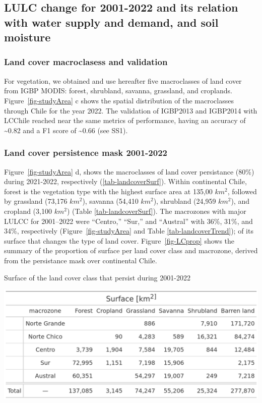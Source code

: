\documentclass[
  authoryear,
  preprint,
  3p,
  onecolumn]{elsarticle}
\begin{document}
\hypertarget{lulc-change-for-2001-2022-and-its-relation-with-water-supply-and-demand-and-soil-moisture}{%
\subsection{LULC change for 2001-2022 and its relation with water supply
and demand, and soil
moisture}\label{lulc-change-for-2001-2022-and-its-relation-with-water-supply-and-demand-and-soil-moisture}}

\hypertarget{land-cover-macroclasess-and-validation-1}{%
\subsubsection{Land cover macroclasess and
validation}\label{land-cover-macroclasess-and-validation-1}}

For vegetation, we obtained and use hereafter five macroclasses of land
cover from IGBP MODIS: forest, shrubland, savanna, grassland, and
croplands. Figure~\ref{fig-studyArea} c shows the spatial distribution
of the macroclasses through Chile for the year 2022. The validation of
IGBP2013 and IGBP2014 with LCChile reached near the same metrics of
performance, having an accuracy of \textasciitilde0.82 and a F1 score of
\textasciitilde0.66 (see SS1).

\hypertarget{sec-persistence_mask}{%
\subsubsection{Land cover persistence mask
2001-2022}\label{sec-persistence_mask}}

Figure~\ref{fig-studyArea} d, shows the macroclasses of land cover
persistance (80\%) during 2021-2022, respectively
(\ref{tab-landcoverSurf}). Within continental Chile, forest is the
vegetation type with the highest surface area at 135,00 \(km^2\),
followed by grassland (73,176 \(km^2\)), savanna (54,410 \(km^2\)),
shrubland (24,959 \(km^2\)), and cropland (3,100 \(km^2\)) (Table
\ref{tab-landcoverSurf}). The macrozones with major LULCC for 2001--2022
were ``Centro,'' ``Sur,'' and ``Austral'' with 36\%, 31\%, and 34\%,
respectively (Figure~\ref{fig-studyArea} and Table
\ref{tab-landcoverTrend}); of its surface that changes the type of land
cover. Figure~\ref{fig-LCprop} shows the summary of the proportion of
surface per land cover class and macrozone, derived from the persistance
mask over continental Chile.

\begin{table}[!ht]
\caption{Surface of the land cover class that persist during 2001-2022}
\label{tab-landcoverSurf}
\includegraphics[width = .5\textwidth]{../output/figs/table_surface_landcover_macrozone.png}
\end{table}
\end{document}
